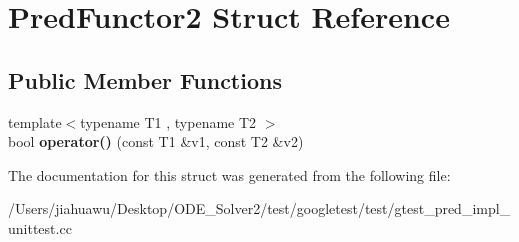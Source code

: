 \hypertarget{struct_pred_functor2}{}\section{Pred\+Functor2 Struct Reference}
\label{struct_pred_functor2}
\subsection*{Public Member Functions}
\begin{DoxyCompactItemize}
\item 
\mbox{\label{struct_pred_functor2_a2142c86e4c0a3139e167dd3f13eb7f6f}} 
{\footnotesize template$<$typename T1 , typename T2 $>$ }\\bool {\bfseries operator()} (const T1 \&v1, const T2 \&v2)
\end{DoxyCompactItemize}


The documentation for this struct was generated from the following file\+:\begin{DoxyCompactItemize}
\item 
/\+Users/jiahuawu/\+Desktop/\+O\+D\+E\+\_\+\+Solver2/test/googletest/test/gtest\+\_\+pred\+\_\+impl\+\_\+unittest.\+cc\end{DoxyCompactItemize}

